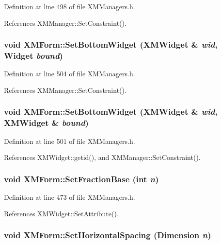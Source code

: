 Definition at line 498 of file XMManagers.h.

References XMManager::Set\-Constraint().
\subsubsection{\setlength{\rightskip}{0pt plus 5cm}void XMForm::Set\-Bottom\-Widget ({\bf XMWidget} \& {\em wid}, Widget {\em bound})\hspace{0.3cm}{\tt  [inline]}}\label{classXMForm_a14}




Definition at line 504 of file XMManagers.h.

References XMManager::Set\-Constraint().
\subsubsection{\setlength{\rightskip}{0pt plus 5cm}void XMForm::Set\-Bottom\-Widget ({\bf XMWidget} \& {\em wid}, {\bf XMWidget} \& {\em bound})\hspace{0.3cm}{\tt  [inline]}}\label{classXMForm_a13}




Definition at line 501 of file XMManagers.h.

References XMWidget::getid(), and XMManager::Set\-Constraint().
\subsubsection{\setlength{\rightskip}{0pt plus 5cm}void XMForm::Set\-Fraction\-Base (int {\em n})\hspace{0.3cm}{\tt  [inline]}}\label{classXMForm_a5}




Definition at line 473 of file XMManagers.h.

References XMWidget::Set\-Attribute().
\subsubsection{\setlength{\rightskip}{0pt plus 5cm}void XMForm::Set\-Horizontal\-Spacing (Dimension {\em n})\hspace{0.3cm}{\tt  [inline]}}\label{classXMForm_a6}




